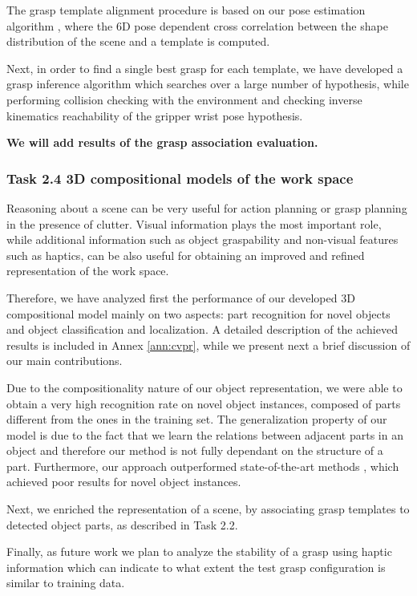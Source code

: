 \documentclass[a4paper,11pt,pdf]{../templates/pacmanreport}
\begin{document}
The grasp template alignment procedure is based on our pose estimation algorithm \cite{detry2010ac}, where the 6D pose dependent cross correlation between the shape distribution of the scene and a template is computed. 

Next, in order to find a single best grasp for each template, we have developed a grasp inference algorithm which searches over a large number of hypothesis, while performing collision checking with the environment and checking inverse kinematics reachability of the gripper wrist pose hypothesis.

\textbf{We will add results of the grasp association evaluation.}

\subsubsection{Task 2.4 3D compositional models of the work space}

Reasoning about a scene can be very useful for action planning or grasp planning in the presence of clutter. Visual information plays the most important role, while additional information such as object graspability and non-visual features such as haptics, can be also useful for obtaining an improved and refined representation of the work space.

Therefore, we have analyzed first the performance of our developed 3D compositional model mainly on two aspects: part recognition for novel objects and object classification and localization. A detailed description of the achieved results is included in Annex \ref{ann:cvpr}, while we present next a brief discussion of our main contributions.

Due to the compositionality nature of our object representation, we were able to obtain a very high recognition rate on novel object instances, composed of parts different from the ones in the training set. The generalization property of our model is due to the fact that we learn the relations between adjacent parts in an object and therefore our method is not fully dependant on the structure of a part. Furthermore, our approach outperformed state-of-the-art methods \cite{vfh}, which achieved poor results for novel object instances.

Next, we enriched the representation of a scene, by associating grasp templates to detected object parts, as described in Task 2.2.

Finally, as future work we plan to analyze the stability of a grasp using haptic information which can indicate to what extent the test grasp configuration is similar to training data.
\end{document}
